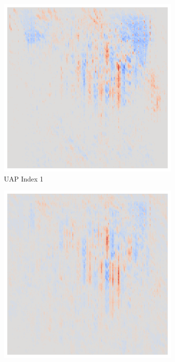\begin{figure}[ht!]
\begin{subfigure}{0.19\linewidth}
        \includegraphics[height=1\linewidth]{01-images/05-resultate/uap_efficientnet/uap0-efficientnetv2m-mri-n200-robustificationslevel1.png}
        \caption{UAP Index 1}
    \end{subfigure}\hfill%
    \begin{subfigure}{0.19\linewidth}
        \centering
        \includegraphics[height=1\linewidth]{01-images/05-resultate/uap_efficientnet/uap0-efficientnetv2m-mri-n200-robustificationslevel2.png}

\end{subfigure}
\end{figure}
